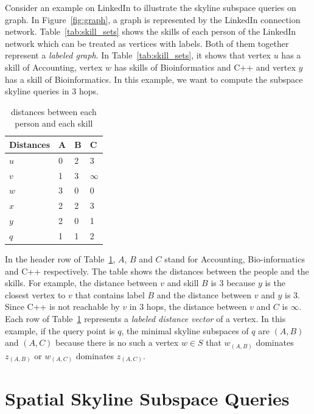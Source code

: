 Consider an example on LinkedIn to illustrate the skyline subspace queries on graph. In Figure~\ref{fig:graph}, a graph is represented by the LinkedIn connection network. Table~\ref{tab:skill_sets} shows the skills of each person of the LinkedIn network which can be treated as vertices with labels. 
Both of them together represent a \emph{labeled graph}. In Table~\ref{tab:skill_sets}, it shows that vertex $u$ has a skill of Accounting, vertex $w$ has skills of Bioinformatics and C++ and vertex $y$ has a skill of Bioinformatics. In this example, we want to compute the subspace skyline queries in $3$ hops.

\begin{table}[h]
    \centering
    \begin{tabular}{llll}
    \hline
        Distances & A & B & C \\ \hline
        $u$       & 0 & 2 & 3 \\ \hline
        $v$       & 1 & 3 & $\infty$ \\ \hline
        $w$       & 3 & 0 & 0 \\ \hline
        $x$       & 2 & 2 & 3 \\ \hline
        $y$       & 2 & 0 & 1 \\ \hline
        $q$       & 1 & 1 & 2 \\ \hline
    \end{tabular}
    \caption{\label{tab:distances_graph} distances between each person and each skill}
    
\end{table}

In the header row of Table~\ref{tab:distances_graph}, $A$, $B$ and $C$ stand for Accounting, Bio-informatics and C++ respectively. The table shows the distances between the people and the skills. For example, the distance between $v$ and skill $B$ is $3$ because $y$ is the closest vertex to $v$ that contains label $B$ and the distance between $v$ and $y$ is $3$. Since C++ is not reachable by $v$ in $3$ hops, the distance between $v$ and $C$ is $\infty$. Each row of Table~\ref{tab:distances_graph} represents a \emph{labeled distance vector} of a vertex.
In this example, if the query point is $q$, the minimal skyline subspaces of $q$ are $(A, B)$ and $(A, C)$ because there is no such a vertex $w \in S$ that $w_{(A,B)}$ dominates $z_{(A,B)}$ or $w_{(A,C)}$ dominates $z_{(A,C)}$.


\section{Spatial Skyline Subspace Queries}

